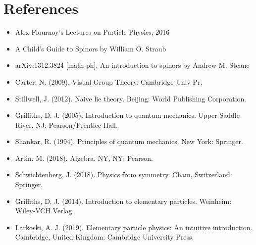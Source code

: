 \documentclass[]{article}
\begin{document}
\section*{References}
\begin{itemize}
\item Alex Flournoy's Lectures on Particle Physics, 2016
\item A Child’s Guide to Spinors by William O. Straub
\item arXiv:1312.3824 [math-ph], An introduction to spinors by Andrew M. Steane 
\item Carter, N. (2009). Visual Group Theory. Cambridge Univ Pr.
\item Stillwell, J. (2012). Naive lie theory. Beijing: World Publishing Corporation.
\item Griffiths, D. J. (2005). Introduction to quantum mechanics. Upper Saddle River, NJ: Pearson/Prentice Hall.
\item Shankar, R. (1994). Principles of quantum mechanics. New York: Springer.
\item Artin, M. (2018). Algebra. NY, NY: Pearson.
\item Schwichtenberg, J. (2018). Physics from symmetry. Cham, Switzerland: Springer.
\item Griffiths, D. J. (2014). Introduction to elementary particles. Weinheim: Wiley-VCH Verlag.
\item Larkoski, A. J. (2019). Elementary particle physics: An intuitive introduction. Cambridge, United Kingdom: Cambridge University Press.
\end{itemize}
\end{document}
